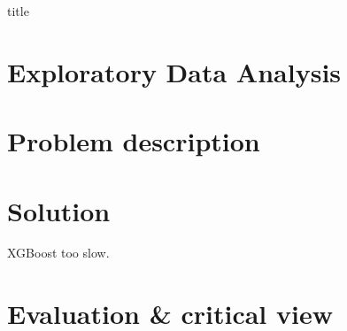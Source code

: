 \documentclass[12pt]{article}
\begin{document}

{title}


\tableofcontents

\restoregeometry
{}

\section{Exploratory Data Analysis}
\section{Problem description}
\section{Solution}
XGBoost too slow.
\section{Evaluation \& critical view}
\end{document}

